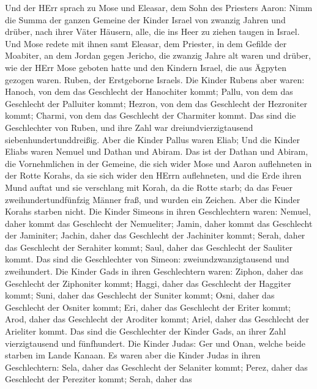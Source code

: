  Und der HErr sprach zu Mose und Eleasar, dem Sohn des
Priesters Aaron:  Nimm die Summa der ganzen Gemeine der
Kinder Israel von zwanzig Jahren und drüber, nach ihrer Väter Häusern,
alle, die ins Heer zu ziehen taugen in Israel.  Und Mose
redete mit ihnen samt Eleasar, dem Priester, in dem Gefilde der
Moabiter, an dem Jordan gegen Jericho,  die zwanzig Jahre
alt waren und drüber, wie der HErr Mose geboten hatte und den Kindern
Israel, die aus Ägpyten gezogen waren.  Ruben, der
Erstgeborne Israels. Die Kinder Rubens aber waren: Hanoch, von dem das
Geschlecht der Hanochiter kommt; Pallu, von dem das Geschlecht der
Palluiter kommt;  Hezron, von dem das Geschlecht der
Hezroniter kommt; Charmi, von dem das Geschlecht der Charmiter kommt.
 Das sind die Geschlechter von Ruben, und ihre Zahl war
dreiundvierzigtausend siebenhundertunddreißig.  Aber die
Kinder Pallus waren Eliab;  Und die Kinder Eliabs waren
Nemuel und Dathan und Abiram. Das ist der Dathan und Abiram, die
Vornehmlichen in der Gemeine, die sich wider Mose und Aaron auflehneten
in der Rotte Korahs, da sie sich wider den HErrn auflehneten,
 und die Erde ihren Mund auftat und sie verschlang mit
Korah, da die Rotte starb; da das Feuer zweihundertundfünfzig Männer
fraß, und wurden ein Zeichen.  Aber die Kinder Korahs
starben nicht.  Die Kinder Simeons in ihren Geschlechtern
waren: Nemuel, daher kommt das Geschlecht der Nemueliter; Jamin, daher
kommt das Geschlecht der Jaminiter; Jachin, daher das Geschlecht der
Jachiniter kommt;  Serah, daher das Geschlecht der
Serahiter kommt; Saul, daher das Geschlecht der Sauliter kommt.
 Das sind die Geschlechter von Simeon:
zweiundzwanzigtausend und zweihundert.  Die Kinder Gads in
ihren Geschlechtern waren: Ziphon, daher das Geschlecht der Ziphoniter
kommt; Haggi, daher das Geschlecht der Haggiter kommt; Suni, daher das
Geschlecht der Suniter kommt;  Osni, daher das Geschlecht
der Osniter kommt; Eri, daher das Geschlecht der Eriter kommt;
 Arod, daher das Geschlecht der Aroditer kommt; Ariel,
daher das Geschlecht der Arieliter kommt.  Das sind die
Geschlechter der Kinder Gads, an ihrer Zahl vierzigtausend und
fünfhundert.  Die Kinder Judas: Ger und Onan, welche beide
starben im Lande Kanaan.  Es waren aber die Kinder Judas in
ihren Geschlechtern: Sela, daher das Geschlecht der Selaniter kommt;
Perez, daher das Geschlecht der Pereziter kommt; Serah, daher das
